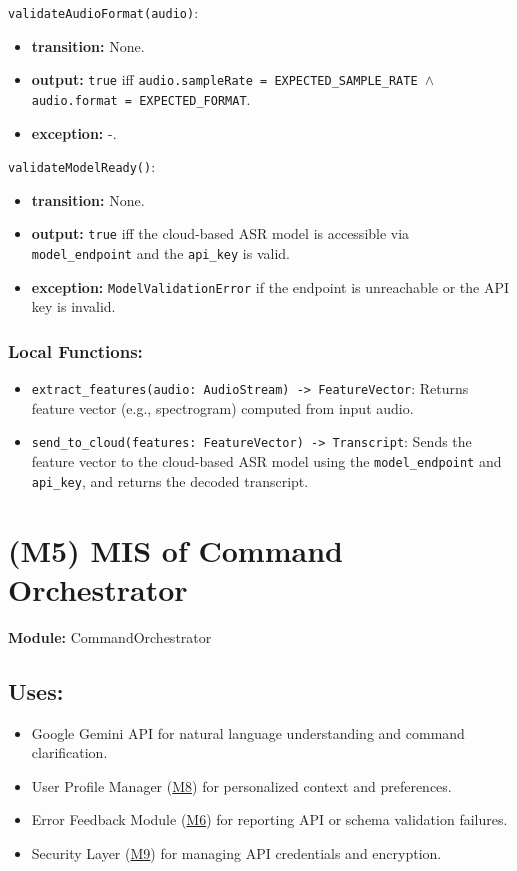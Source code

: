 \documentclass[12pt, titlepage]{article}
\begin{document}
\noindent\texttt{validateAudioFormat(audio)}:
\begin{itemize}
  \item \textbf{transition:} None.
  \item \textbf{output:} \texttt{true} iff \texttt{audio.sampleRate = EXPECTED\_SAMPLE\_RATE $\wedge$ audio.format = EXPECTED\_FORMAT}.
  \item \textbf{exception:} -.
\end{itemize}

\noindent\texttt{validateModelReady()}:
\begin{itemize}
  \item \textbf{transition:} None.
  \item \textbf{output:} \texttt{true} iff the cloud-based ASR model is accessible via \texttt{model\_endpoint} and the \texttt{api\_key} is valid.
  \item \textbf{exception:} \texttt{ModelValidationError} if the endpoint is unreachable or the API key is invalid.
\end{itemize}

\subsubsection{Local Functions:}
\begin{itemize}
  \item \texttt{extract\_features(audio: AudioStream) -> FeatureVector}: Returns feature vector (e.g., spectrogram) computed from input audio.
  \item \texttt{send\_to\_cloud(features: FeatureVector) -> Transcript}: Sends the feature vector to the cloud-based ASR model using the \texttt{model\_endpoint} and \texttt{api\_key}, and returns the decoded transcript.
\end{itemize}



\newpage
\section{(M5) MIS of Command Orchestrator}
\label{M5}
\textbf{Module:} CommandOrchestrator

\subsection{Uses:}
\begin{itemize}
  \item Google Gemini API for natural language understanding and command clarification.
 \item User Profile Manager (\hyperref[M8]{M8}) for personalized context and preferences.
  \item Error Feedback Module (\hyperref[M6]{M6}) for reporting API or schema validation failures.
  \item Security Layer (\hyperref[M9]{M9}) for managing API credentials and encryption.
\end{itemize}
\end{document}
